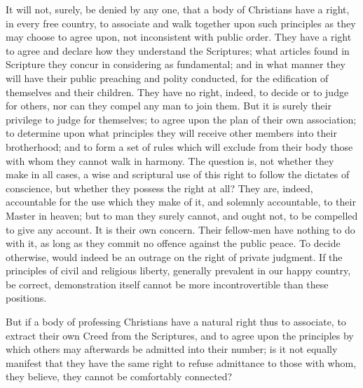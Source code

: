 \documentclass[
]{book}
\begin{document}
It will not, surely, be denied by any one, that a body of Christians have a right, in every free country, to associate and walk together upon such principles as they may choose to agree upon, not inconsistent with public order. They have a right to agree and declare how they understand the Scriptures; what articles found in Scripture they concur in considering as fundamental; and in what manner they will have their public preaching and polity conducted, for the edification of themselves and their children. They have no right, indeed, to decide or to judge for others, nor can they compel any man to join them. But it is surely their privilege to judge for themselves; to agree upon the plan of their own association; to determine upon what principles they will receive other members into their brotherhood; and to form a set of rules which will exclude from their body those with whom they cannot walk in harmony. The question is, not whether they make in all cases, a wise and scriptural use of this right to follow the dictates of conscience, but whether they possess the right at all? They are, indeed, accountable for the use which they make of it, and solemnly accountable, to their Master in heaven; but to man they surely cannot, and ought not, to be compelled to give any account. It is their own concern. Their fellow-men have nothing to do with it, as long as they commit no offence against the public peace. To decide otherwise, would indeed be an outrage on the right of private judgment. If the principles of civil and religious liberty, generally prevalent in our happy country, be correct, demonstration itself cannot be more incontrovertible than these positions.

But if a body of professing Christians have a natural right thus to associate, to extract their own Creed from the Scriptures, and to agree upon the principles by which others may afterwards be admitted into their number; is it not equally manifest that they have the same right to refuse admittance to those with whom, they believe, they cannot be comfortably connected?
\end{document}
